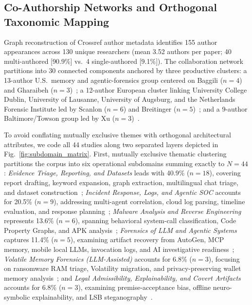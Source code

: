 \subsection{Co-Authorship Networks and Orthogonal Taxonomic Mapping}
Graph reconstruction of Crossref author metadata identifies 155 author appearances across 130 unique researchers (mean 3.52 authors per paper; 40 multi-authored [90.9\%] vs.\ 4 single-authored [9.1\%]). The collaboration network partitions into 30 connected components anchored by three productive clusters: a 13-author U.S.\ memory and agentic-forensics group centered on Baggili ($n=4$) and Gharaibeh ($n=3$)~\cite{sharma2025_forensicllm, gharaibeh2026_rusting, satter2026_with}; a 12-author European cluster linking University College Dublin, University of Lausanne, University of Augsburg, and the Netherlands Forensic Institute led by Scanlon ($n=6$) and Breitinger ($n=5$)~\cite{scanlon2023_digital, michelet2025_finetuning, studiawan2025_towards}; and a 9-author Baltimore/Towson group led by Xu ($n=3$)~\cite{xu2024_transforming, zhou2025_forensic, khatiwala2025_evaluating}.

To avoid conflating mutually exclusive themes with orthogonal architectural attributes, we code all 44 studies along two separated layers depicted in Fig.~\ref{fig:subdomain_matrix}. First, mutually exclusive thematic clustering partitions the corpus into six operational subdomains summing exactly to $N=44$: \textit{Evidence Triage, Reporting, and Datasets} leads with 40.9\% ($n=18$), covering report drafting, keyword expansion, graph extraction, multilingual chat triage, and dataset construction~\cite{michelet2024_chatgpt, chakir2025_forensicsdata, yoo2026_scpllmscp, johnson2026_aiassisted}; \textit{Incident Response, Logs, and Agentic SOC} accounts for 20.5\% ($n=9$), addressing multi-agent correlation, cloud log parsing, timeline evaluation, and response planning~\cite{liu2025_autobnb, hammar2026_incident, alharthi2025_llmpowered, studiawan2025_towards}; \textit{Malware Analysis and Reverse Engineering} represents 13.6\% ($n=6$), spanning behavioral system-call classification, Code Property Graphs, and APK analysis~\cite{clark2025_large, sava2026_triagecpg, zheng2025_avagent, ozyurt2026_llmorchestrated}; \textit{Forensics of LLM and Agentic Systems} captures 11.4\% ($n=5$), examining artifact recovery from AutoGen, MCP memory, mobile local LLMs, invocation logs, and AI investigative readiness~\cite{chernyshev2023_towards, walker2024_forensic, xu2026_recovering, satter2026_with, scanlon2026_investigation}; \textit{Volatile Memory Forensics (LLM-Assisted)} accounts for 6.8\% ($n=3$), focusing on ransomware RAM triage, Volatility migration, and privacy-preserving wallet memory analysis~\cite{oh2024_volgpt, gharaibeh2026_rusting, kao2026_a}; and \textit{Legal Admissibility, Explainability, and Covert Artifacts} accounts for 6.8\% ($n=3$), examining premise-acceptance bias, offline neuro-symbolic explainability, and LSB steganography~\cite{trivedi2026_when, tiwari2026_xforensicnet, sudheer2026_least}.

